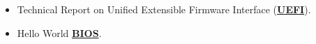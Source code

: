 \documentclass[letterpaper]{twentysecondcv} %
\begin{document}
\begin{itemize}
{          for OS course at Alexandria University.}
    \item{Technical Report on Unified Extensible Firmware Interface (\textbf{\underline{UEFI}}).}
    \item{Hello World \textbf{\underline{BIOS}}.}
\end{itemize}


%

\end{document}

